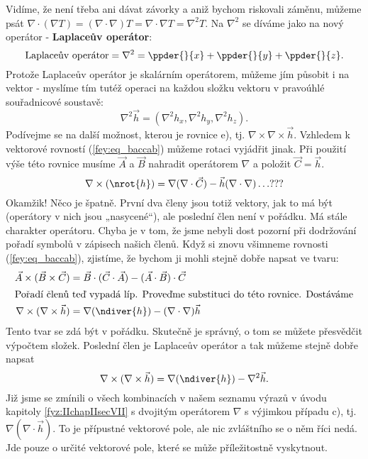     Vidíme, že není třeba ani dávat závorky a aniž bychom riskovali záměnu, můžeme psát \(\nabla 
    \cdot(\nabla T) = (\nabla\cdot\nabla)T = \nabla\cdot\nabla T = \nabla^2T\). Na \(\nabla^2\) se 
    díváme jako na nový operátor - \textbf{Laplaceův operátor}:
    \begin{equation}\label{fyz:eq687}
      \text{Laplaceův operátor} = \nabla^2 = \ppder{}{x} + \ppder{}{y} + \ppder{}{z}.
    \end{equation}
    Protože Laplaceův operátor je skalárním operátorem, můžeme jím působit i na vektor - myslíme 
    tím tutéž operaci na každou složku vektoru v pravoúhlé souřadnicové soustavě:
    \begin{equation*}
      \nabla^2\vec{h} = (\nabla^2h_x, \nabla^2h_y, \nabla^2h_z).
    \end{equation*}
    Podívejme se na další možnost, kterou je rovnice e), tj. \(\nabla\times\nabla\times\vec{h}\). 
    Vzhledem k vektorové rovností (\ref{fey:eq_baccab}) můžeme rotaci vyjádřit jinak. Při použití 
    výše této rovnice 
    musíme \(\vec{A}\) a \(\vec{B}\) nahradit operátorem \(\nabla\) a položit \(\vec{C} = \vec{h}\).
    \begin{equation*}
      \nabla\times(\nrot{h}) = \nabla(\nabla\cdot\vec{C}) - \vec{h}(\nabla\cdot\nabla) \ldots ???
    \end{equation*}
    Okamžik! Něco je špatně. První dva členy jsou totiž vektory, jak to má být (operátory v nich 
    jsou „nasycené“), ale poslední člen není v pořádku. Má stále charakter operátoru. Chyba je v 
    tom, že jsme nebyli dost pozorní při dodržování pořadí symbolů v zápisech našich členů. Když si 
    znovu všimneme rovnosti (\ref{fey:eq_baccab}), zjistíme, že bychom ji mohli stejně dobře napsat 
    ve tvaru:
    \begin{align*}
      \vec{A}\times(\vec{B}\times\vec{C}) 
        &= \vec{B}\cdot(\vec{C}\cdot\vec{A}) - (\vec{A}\cdot\vec{B})\cdot\vec{C}  \\
      \shortintertext{Pořadí členů teď vypadá líp. Proveďme substituci do této rovnice. Dostáváme} 
      \nabla\times(\nabla\times\vec{h})
        &= \nabla(\ndiver{h}) - (\nabla\cdot\nabla)\vec{h} 
    \end{align*}
    Tento tvar se zdá být v pořádku. Skutečně je správný, o tom se můžete přesvědčit výpočtem 
    složek. Poslední člen je Laplaceův operátor a tak můžeme stejně dobře napsat
    \begin{equation*}
      \nabla\times(\nabla\times\vec{h}) = \nabla(\ndiver{h}) - \nabla^2\vec{h}.
    \end{equation*}
    Již jsme se zmínili o všech kombinacích v našem seznamu výrazů v úvodu kapitoly  
    \ref{fyz:IIchapIIsecVII} s dvojitým operátorem \(\nabla\) s výjimkou případu c), 
    tj.\(\nabla(\nabla\cdot\vec{h})\). To je přípustné vektorové pole, ale nic zvláštního se o něm 
    říci nedá. Jde pouze o určité vektorové pole, které se může příležitostně vyskytnout.

